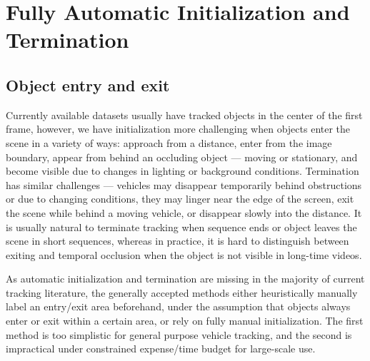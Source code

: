 \section{Fully Automatic Initialization and Termination}
\label{sec:tracker-init-term}

\subsection{Object entry and exit} 
\label{subsec:tracker-entry-exit}

Currently available datasets usually have tracked objects in the center of the first frame, however, we have initialization more challenging when objects enter the scene in a variety of ways: approach from a distance, enter from the image boundary, appear from behind an occluding object --- moving or stationary, and become visible due to changes in lighting or background conditions. Termination has similar challenges --- vehicles may disappear temporarily behind obstructions or due to changing conditions, they may linger near the edge of the screen, exit the scene while behind a moving vehicle, or disappear slowly into the distance. It is usually natural to terminate tracking when sequence ends or object leaves the scene in short sequences, whereas in practice, it is hard to distinguish between exiting and temporal occlusion when the object is not visible in long-time videos.

As automatic initialization and termination are missing in the majority of current tracking literature, the generally accepted methods either heuristically manually label an entry/exit area beforehand, under the assumption that objects always enter or exit within a certain area, or rely on fully manual initialization. The first method is too simplistic for general purpose vehicle tracking, and the second is impractical under constrained expense/time budget for large-scale use.

